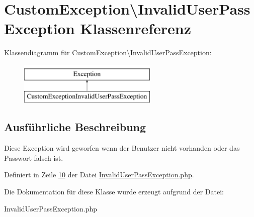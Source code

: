 \hypertarget{class_custom_exception_1_1_invalid_user_pass_exception}{\section{Custom\-Exception\textbackslash{}Invalid\-User\-Pass\-Exception Klassenreferenz}
\label{class_custom_exception_1_1_invalid_user_pass_exception}
}
Klassendiagramm für Custom\-Exception\textbackslash{}Invalid\-User\-Pass\-Exception\-:\begin{figure}[H]
\begin{center}
\leavevmode
\includegraphics[height=2.000000cm]{class_custom_exception_1_1_invalid_user_pass_exception}
\end{center}
\end{figure}


\subsection{Ausführliche Beschreibung}
Diese Exception wird geworfen wenn der Benutzer nicht vorhanden oder das Passwort falsch ist. 

Definiert in Zeile \hyperlink{_invalid_user_pass_exception_8php_source_l00010}{10} der Datei \hyperlink{_invalid_user_pass_exception_8php_source}{Invalid\-User\-Pass\-Exception.\-php}.



Die Dokumentation für diese Klasse wurde erzeugt aufgrund der Datei\-:\begin{DoxyCompactItemize}
\item 
Invalid\-User\-Pass\-Exception.\-php\end{DoxyCompactItemize}
